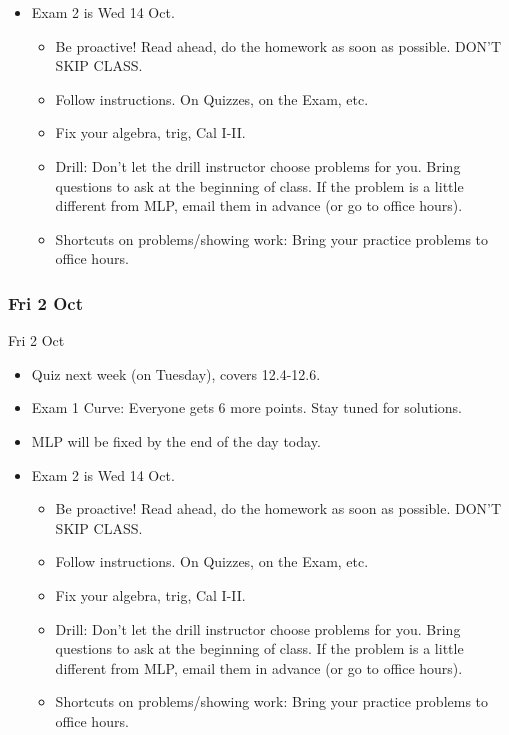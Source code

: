 \documentclass[12pt]{beamer}
\theoremstyle{plain}
\theoremstyle{definition}
\begin{document}
%
\begin{frame}
\begin{itemize}
\item Exam 2 is Wed 14 Oct.
	\begin{itemize}
	\item Be proactive!  Read ahead, do the homework as soon as possible.  DON'T SKIP CLASS.
	\item Follow instructions.  On Quizzes, on the Exam, etc.
	\item Fix your algebra, trig, Cal I-II.
	\item Drill: Don't let the drill instructor choose problems for you.  Bring questions to ask at the beginning of class.  If the problem is a little different from MLP, email them in advance (or go to office hours).
	\item Shortcuts on problems/showing work: Bring your practice problems to office hours.
	\end{itemize}
\end{itemize}
\end{frame}

\subsubsection{Fri 2 Oct}
\begin{frame}{Fri 2 Oct}%
\begin{itemize}
\item Quiz next week (on Tuesday), covers 12.4-12.6.  
\item Exam 1 Curve: Everyone gets 6 more points.  Stay tuned for solutions.
\item MLP will be fixed by the end of the day today.
\end{itemize}
\end{frame}

%
\begin{frame}
\begin{itemize}
\item Exam 2 is Wed 14 Oct.
	\begin{itemize}
	\item Be proactive!  Read ahead, do the homework as soon as possible.  DON'T SKIP CLASS.
	\item Follow instructions.  On Quizzes, on the Exam, etc.
	\item Fix your algebra, trig, Cal I-II.
	\item Drill: Don't let the drill instructor choose problems for you.  Bring questions to ask at the beginning of class.  If the problem is a little different from MLP, email them in advance (or go to office hours).
	\item Shortcuts on problems/showing work: Bring your practice problems to office hours.
	\end{itemize}
\end{itemize}
\end{frame}
\end{document}
